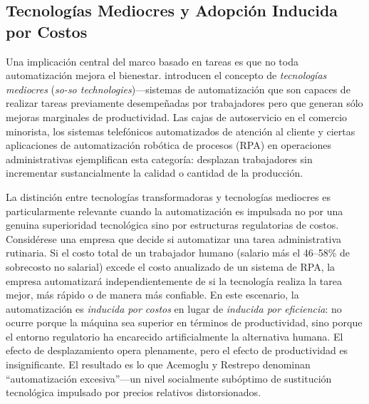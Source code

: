 \documentclass{article}
\begin{document}
\subsection{Tecnolog\'ias Mediocres y Adopci\'on Inducida por Costos}
\label{subsec:soso}

Una implicaci\'on central del marco basado en tareas es que no toda automatizaci\'on mejora el bienestar. \cite{acemoglu2019automation} introducen el concepto de \textit{tecnolog\'ias mediocres} (\textit{so-so technologies})---sistemas de automatizaci\'on que son capaces de realizar tareas previamente desempe\~nadas por trabajadores pero que generan s\'olo mejoras marginales de productividad. Las cajas de autoservicio en el comercio minorista, los sistemas telef\'onicos automatizados de atenci\'on al cliente y ciertas aplicaciones de automatizaci\'on rob\'otica de procesos (RPA) en operaciones administrativas ejemplifican esta categor\'ia: desplazan trabajadores sin incrementar sustancialmente la calidad o cantidad de la producci\'on.

La distinci\'on entre tecnolog\'ias transformadoras y tecnolog\'ias mediocres es particularmente relevante cuando la automatizaci\'on es impulsada no por una genuina superioridad tecnol\'ogica sino por estructuras regulatorias de costos. Consid\'erese una empresa que decide si automatizar una tarea administrativa rutinaria. Si el costo total de un trabajador humano (salario m\'as el 46--58\% de sobrecosto no salarial) excede el costo anualizado de un sistema de RPA, la empresa automatizar\'a independientemente de si la tecnolog\'ia realiza la tarea mejor, m\'as r\'apido o de manera m\'as confiable. En este escenario, la automatizaci\'on es \textit{inducida por costos} en lugar de \textit{inducida por eficiencia}: no ocurre porque la m\'aquina sea superior en t\'erminos de productividad, sino porque el entorno regulatorio ha encarecido artificialmente la alternativa humana. El efecto de desplazamiento opera plenamente, pero el efecto de productividad es insignificante. El resultado es lo que Acemoglu y Restrepo denominan ``automatizaci\'on excesiva''---un nivel socialmente sub\'optimo de sustituci\'on tecnol\'ogica impulsado por precios relativos distorsionados.
\end{document}
